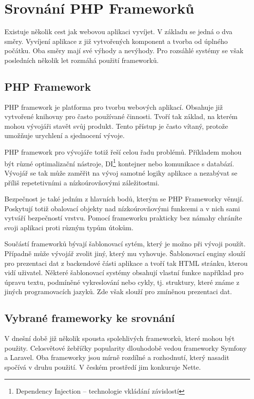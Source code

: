 \documentclass[czech,BP]{thesiskiv}
\begin{document}
\section{Srovnání PHP Frameworků}
	\par Existuje několik cest jak webovou aplikaci vyvíjet. V základu se jedná o dva směry. Vyvíjení aplikace z již vytvořených komponent a tvorba od úplného počátku. Oba směry mají své výhody a nevýhody. Pro rozsáhlé systémy se však posledních několik let rozmáhá použití frameworků.
	\subsection{PHP Framework}
	\par PHP framework je platforma pro tvorbu webových aplikací. Obsahuje již vytvořené knihovny pro často používané činnosti. Tvoří tak základ, na kterém mohou vývojáři stavět svůj produkt. Tento přístup je často vítaný, protože umožňuje urychlení a sjednocení vývoje.
	\par PHP framework pro vývojáře totiž řeší celou řadu problémů. Příkladem mohou být různé optimalizační nástroje, DI\footnote{Dependency Injection -- technologie vkládání závislostí} kontejner nebo komunikace s databází. Vývojář se tak může zaměřit na vývoj samotné logiky aplikace a nezabývat se příliš repetetivními a nízkoúrovňovými záležitostmi.
	\par Bezpečnost je také jedním z hlavních bodů, kterým se PHP Frameworky věnují. Poskytují totiž obalovací objekty nad nízkoúrovňovými funkcemi a v nich sami vytváří bezpečností vrstvu. Pomocí frameworku prakticky bez námahy chráníte svoji aplikaci proti různým typům útokům. 
	\par Součástí frameworků bývají šablonovací sytém, který je možno při vývoji použít. Případně může vývojář zvolit jiný, který mu vyhovuje. Šablonovací enginy slouží pro prezentaci dat z backendové části aplikace a tvoří tak HTML stránku, kterou vidí uživatel. Některé šablonovací systémy obsahují vlastní funkce například pro úpravu textu, podmíněné vykreslování nebo cykly, tj. struktury, které známe z jiných programovacích jazyků. Zde však slouží pro zmíněnou prezentaci dat.
	\subsection{Vybrané frameworky ke srovnání}
	\par V dnešní době již několik spousta spolehlivých frameworků, které mohou být použity. Celosvětové žebříčky popularity dlouhodobě vedou frameworky Symfony a Laravel. Oba frameworky jsou mírně rozdílné a rozhodnutí, který nasadit spočívá v druhu použití. V českém prostředí jim konkuruje Nette.
\end{document}
